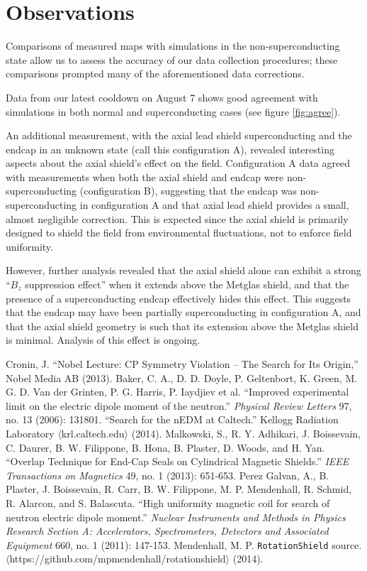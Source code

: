\documentclass[twocolumn,aps,prb,citeautoscript]{revtex4-1}
\begin{document}
\section{Observations}

Comparisons of measured maps with simulations in the non-superconducting state allow us to assess the accuracy
of our data collection procedures; these comparisons prompted many of the aforementioned data corrections.

Data from our latest cooldown on August 7 shows good agreement with simulations
in both normal and superconducting cases (see
figure \ref{fig:agree}).

An additional
measurement, with the axial lead shield superconducting and the endcap in an unknown state (call this
configuration A), revealed interesting aspects about the axial shield's effect on the field.
Configuration A data agreed with measurements when both the
axial shield and endcap were non-superconducting (configuration B),
suggesting that the endcap was non-superconducting in configuration A and
that axial lead shield provides a small, almost negligible correction. This is expected since the axial shield
is primarily designed to shield the field from environmental fluctuations, not to enforce field uniformity.

However, further analysis revealed that the axial shield alone can exhibit a strong ``$B_z$ suppression effect''
when it
extends above the Metglas shield, and that the presence of a superconducting endcap effectively hides this effect.
This suggests that the endcap may have been partially superconducting in configuration A, and that the
axial shield geometry is such that its extension above the Metglas shield is minimal. Analysis of this effect
is ongoing.


\begin{thebibliography}{}
 Cronin, J. ``Nobel Lecture: CP Symmetry Violation – The Search
for Its Origin,'' Nobel Media AB (2013).
 Baker, C. A., D. D. Doyle, P. Geltenbort, K. Green, M. G. D. Van der Grinten, P. G. Harris, P. Iaydjiev et al. ``Improved experimental limit on the electric dipole moment of the neutron.'' \textit{Physical Review Letters} 97, no. 13 (2006): 131801.
 ``Search for the nEDM at Caltech.'' Kellogg Radiation Laboratory
$\langle$krl.caltech.edu$\rangle$ (2014).
 Malkowski, S., R. Y. Adhikari, J. Boissevain, C. Daurer, B. W. Filippone, B. Hona, B. Plaster, D. Woods, and H. Yan. ``Overlap Technique for End-Cap Seals on Cylindrical Magnetic Shields.'' \textit{IEEE Transactions on Magnetics} 49, no. 1 (2013): 651-653.
 Perez Galvan, A., B. Plaster, J. Boissevain, R. Carr, B. W. Filippone, M. P. Mendenhall, R. Schmid, R. Alarcon, and S. Balascuta. ``High uniformity magnetic coil for search of neutron electric dipole moment.'' \textit{Nuclear Instruments and Methods in Physics Research Section A: Accelerators, Spectrometers, Detectors and Associated Equipment} 660, no. 1 (2011): 147-153.
 Mendenhall, M. P. \texttt{RotationShield} source. $\langle$https://github.com/mpmendenhall/rotationshield$\rangle$ (2014).
\end{thebibliography}
\end{document}
